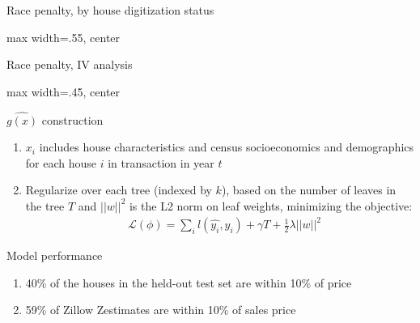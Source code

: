 \documentclass[aspectratio=169,t,11pt,table]{beamer}
\begin{document}
\begin{frame}{Race penalty, by house digitization status }\label{endog_racepenalty}
     \begin{adjustbox}{max width=.55\textwidth, center}
\makebox[\linewidth]{}
    \end{adjustbox}  
\end{frame}


\begin{frame}{Race penalty, IV analysis}\label{iv_racepenalty}
     \begin{adjustbox}{max width=.45\textwidth, center}
\makebox[\linewidth]{}
    \end{adjustbox}  
\end{frame}




\begin{frame}{$\hat{g(x)}$ construction}\label{modeldetails}
\small 
\begin{enumerate}
    \item $x_i$ includes house characteristics and census socioeconomics and demographics for each house $i$ in transaction in year $t$ 
    \item Regularize over each tree (indexed by $k$), based on the number of leaves in the tree $T$ and $||w||^2 $ is the L2 norm on leaf weights, minimizing the objective:
 \begin{align*} \label{eq:xgboostobj}
  & \mathcal{L}(\phi)  = \sum_{i}l(\hat{y_i},y_i) +  \gamma T + \frac{1}{2}\lambda||w||^2 
\end{align*} 
\end{enumerate}
\vspace{-2mm}
\alert{Model performance}
\begin{enumerate}
    \item 40\% of the houses in the held-out test set are within 10\% of price 
    \item 59\% of Zillow Zestimates are within 10\% of sales price 
\end{enumerate} 
\end{frame}
\end{document}
